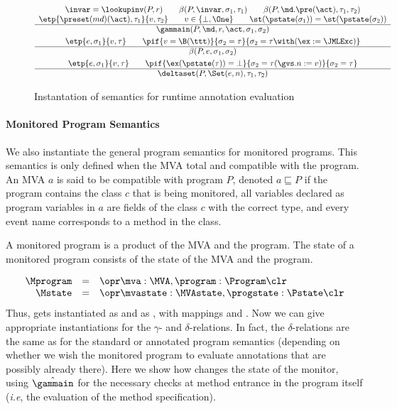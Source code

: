 \begin{figure}[t]
\[
\begin{array}[t]{c}
\invar = \lookupinv(P, r) \qquad 
\beta(P, \invar, \sigma_1, \tau_1) \qquad
\beta(P, \md.\pre(\act), \tau_1, \tau_2) \\
\etp{\preset(md)(\act), \tau_1}{v,\tau_2} \qquad v\in\{\bot,\One\} \qquad
\st(\pstate(\sigma_1)) = \st(\pstate(\sigma_2))\\
\hline
\gammain(P, \md, r, \act, \sigma_1, \sigma_2) 
\smallskip\\


\etp{e, \sigma_1}{v, \tau} \qquad
\pif{v = \B(\ttt)}{\sigma_2 = \tau}{\sigma_2 = \tau \with (\ex := \JMLExc)}\\
\hline
\beta(P, e, \sigma_1, \sigma_2) 

\smallskip\\

\etp{e, \sigma_1}{v, \tau} \qquad
\pif{\ex(\pstate(\tau)) = \bot}{\sigma_2 = \tau (\gvs.n :=
v)}{\sigma_2 = \tau}\\
\hline
\deltaset(P, \Set(e, n), \tau_1, \tau_2) 
\end{array}
\]
\caption{Instantation of semantics for runtime annotation evaluation}
\label{FigAnnotatedSem}
\end{figure}

\paragraph{Monitored Program Semantics}
We also instantiate the general program semantics for monitored
programs. This semantics is only defined when the MVA total and
compatible with the program. An MVA \(a\) is said to be compatible
with program \(P\), denoted \(a \sqsubseteq P\) if the program
contains the class \(c\) that is being monitored, all variables
declared as program variables in
\(a\) are fields of the class \(c\) with the correct type, and every
event name corresponds to a method in the class. 

A monitored program is a product of the MVA and the program.
The state of a monitored program consists of the state of the MVA and
the program.

\[ 
\begin{array}{rcl}
\Mprogram & =  & \opr \mva : \MVA, \program : \Program \clr\\
\Mstate & = & \opr \mvastate : \MVAstate, \progstate : \Pstate \clr
\end{array}
\]
Thus, \FullProgram gets instantiated as \Mprogram and \FullState as
\Mstate, with mappings \program and \progstate. Now we can give
appropriate instantiations for the \(\gamma\)- and
\(\delta\)-relations. In fact, the \(\delta\)-relations are the same as
for the standard or annotated program semantics (depending on whether
we wish the monitored program to evaluate annotations that are
possibly already there). Here we show how \gammain
changes the state of the monitor, using \(\hat\gammain\) for the
necessary checks at method entrance in the program itself (\emph{i.e},
the evaluation of the method specification).

